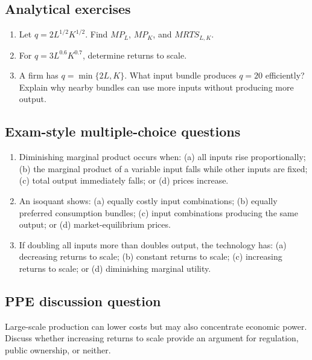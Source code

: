 \subsection*{Analytical exercises}
\begin{enumerate}[resume,label=\arabic*.]
  \item Let $q=2L^{1/2}K^{1/2}$. Find $MP_L$, $MP_K$, and $MRTS_{L,K}$.
  \item For $q=3L^{0.6}K^{0.7}$, determine returns to scale.
  \item A firm has $q=\min\{2L,K\}$. What input bundle produces $q=20$ efficiently? Explain why nearby bundles can use more inputs without producing more output.
\end{enumerate}

\subsection*{Exam-style multiple-choice questions}
\begin{enumerate}[resume,label=\arabic*.]
  \item Diminishing marginal product occurs when: (a) all inputs rise proportionally; (b) the marginal product of a variable input falls while other inputs are fixed; (c) total output immediately falls; or (d) prices increase.
  \item An isoquant shows: (a) equally costly input combinations; (b) equally preferred consumption bundles; (c) input combinations producing the same output; or (d) market-equilibrium prices.
  \item If doubling all inputs more than doubles output, the technology has: (a) decreasing returns to scale; (b) constant returns to scale; (c) increasing returns to scale; or (d) diminishing marginal utility.
\end{enumerate}

\subsection*{PPE discussion question}

\noindent Large-scale production can lower costs but may also concentrate economic power. Discuss whether increasing returns to scale provide an argument for regulation, public ownership, or neither.
